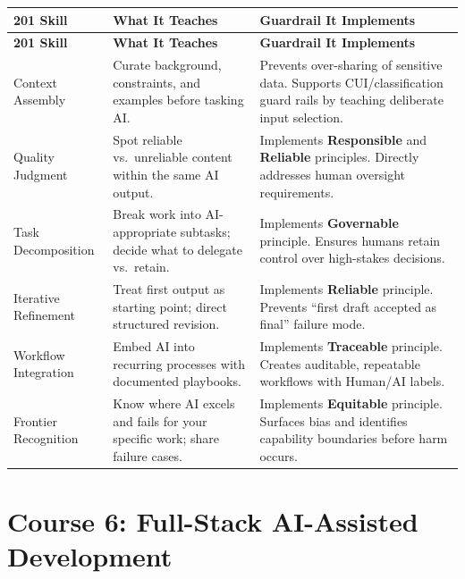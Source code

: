 \documentclass[11pt,letterpaper]{article}
\begin{document}
\renewcommand{\arraystretch}{1.4}
\noindent
\begin{longtable}{>{\raggedright\arraybackslash}p{3.0cm}
                   >{\raggedright\arraybackslash}p{4.5cm}
                   >{\raggedright\arraybackslash}p{5.0cm}}
\toprule
\textbf{201 Skill} & \textbf{What It Teaches} & \textbf{Guardrail It Implements} \\
\midrule
\endfirsthead
\toprule
\textbf{201 Skill} & \textbf{What It Teaches} & \textbf{Guardrail It Implements} \\
\midrule
\endhead

Context Assembly &
  Curate background, constraints, and examples before tasking AI. &
  Prevents over-sharing of sensitive data. Supports CUI/classification guard rails by teaching deliberate input selection. \\
\midrule

Quality Judgment &
  Spot reliable vs.\ unreliable content within the same AI output. &
  Implements \textbf{Responsible} and \textbf{Reliable} principles. Directly addresses human oversight requirements. \\
\midrule

Task Decomposition &
  Break work into AI-appropriate subtasks; decide what to delegate vs.\ retain. &
  Implements \textbf{Governable} principle. Ensures humans retain control over high-stakes decisions. \\
\midrule

Iterative Refinement &
  Treat first output as starting point; direct structured revision. &
  Implements \textbf{Reliable} principle. Prevents ``first draft accepted as final'' failure mode. \\
\midrule

Workflow Integration &
  Embed AI into recurring processes with documented playbooks. &
  Implements \textbf{Traceable} principle. Creates auditable, repeatable workflows with Human/AI labels. \\
\midrule

Frontier Recognition &
  Know where AI excels and fails for your specific work; share failure cases. &
  Implements \textbf{Equitable} principle. Surfaces bias and identifies capability boundaries before harm occurs. \\

\bottomrule
\end{longtable}

\section{Course 6: Full-Stack AI-Assisted Development}
\label{sec:course6}
\end{document}
